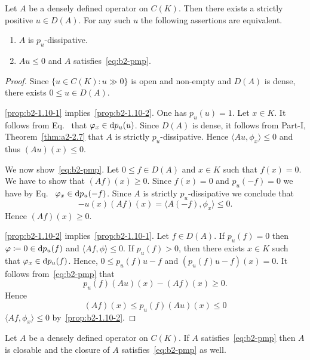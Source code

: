 \begin{proposition}\label{prop:b2-1.10}
%
Let $A$ be a densely defined operator on $C(K)$.
Then there exists a strictly positive $u \in D(A)$.
For any such $u$ the following assertions are equivalent.
\begin{enumerate}[\upshape (a)]
\item  \label{prop:b2-1.10-1}
$A$ is $p_{u}$-dissipative.

\item  \label{prop:b2-1.10-2}
$Au \leq 0$ and $A$ satisfies~\eqref{eq:b2-pmp}.
\end{enumerate}
\end{proposition}
\begin{proof}
Since $\{u \in C(K) \colon u \gg 0\}$ is open and non-empty and $D(A)$ is dense, there exists $0 \leq  u \in D(A)$.

\ref{prop:b2-1.10-1} implies~\ref{prop:b2-1.10-2}.
One has $p_{u}(u) = 1$.
Let $x \in K$.
It follows from Eq.~ that $\phi_{x} \in \ddp_{u}(u)$.
Since $D(A)$ is dense, it follows from Part-I, Theorem~\ref{thm:a2-2.7}
that $A$ is strictly $p_{u}$-dissipative.
Hence $\langle Au,\phi_{x} \rangle \leq 0$ and thus $(Au)(x) \leq 0$.

We now show~\eqref{eq:b2-pmp}.
Let $0 \leq f \in D(A)$ and $x \in K$ such that $f(x) = 0$.
We have to show that $(Af)(x) \geq 0$.
Since $f(x) = 0$ and $p_{u}(-f) = 0$ we have by Eq.~  $\phi_{x} \in \ddp_{u}(-f)$.
Since $A$ is strictly $p_{u}$-dissipative we conclude that 
%
\[
	-u(x)(Af)(x) = \langle A(-f),\phi_{x} \rangle \leq 0.
\]
%
Hence $(Af)(x) \geq 0$.

\ref{prop:b2-1.10-2} implies~\ref{prop:b2-1.10-1}.
Let $f \in D(A)$.
If\/ $p_{u}(f) = 0$ then $\phi \coloneq 0 \in \ddp_{u}(f)$ and $\langle Af,\phi \rangle \leq 0$.
If\/ $p_{u}(f) > 0$, then there exists $x \in K$ such that $\phi_{x} \in \ddp_{u}(f)$.
Hence, $0 \leq p_{u}(f)u - f$ and $(p_{u}(f)u - f)(x) = 0$.
It follows from~\eqref{eq:b2-pmp} that 
%
\[
	p_{u}(f)(Au)(x) - (Af)(x) \geq 0 .
\]
%
Hence 
%
\[
	 (Af)(x) \leq p_{u}(f)(Au)(x) \leq 0 
\]
%
\ie  $\langle Af,\phi_{x} \rangle \leq 0$ 
by~\ref{prop:b2-1.10-2}.
\end{proof}
\begin{corollary}\label{cor:b2-1.11}
Let $A$ be a densely defined operator on $C(K)$.
If\/ $A$ satisfies~\eqref{eq:b2-pmp} then $A$ is closable and the closure of\/ $A$ satisfies~\eqref{eq:b2-pmp} as well.
\end{corollary}
